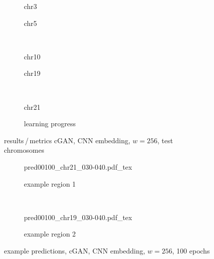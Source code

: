 \begin{figure}[p] %
    \begin{subfigure}{0.45\textwidth}
        \scriptsize
        \caption{chr3}
    \end{subfigure} \hfill
    \begin{subfigure}{0.45\textwidth}
        \scriptsize
        \caption{chr5}
    \end{subfigure}\\[5mm]
    \begin{subfigure}{0.45\textwidth}
        \scriptsize
        \caption{chr10}
    \end{subfigure}\hfill
    \begin{subfigure}{0.45\textwidth}
        \scriptsize
        \caption{chr19}
    \end{subfigure}\\[3mm]
    \centering
    \begin{subfigure}{0.45\textwidth}
        \scriptsize
        \caption{chr21}
    \end{subfigure} \hfill
    \begin{subfigure}{0.45\textwidth}
        \scriptsize
        \caption{learning progress} \label{fig:results:GAN256_lossEpochs}
    \end{subfigure}
    \caption{results\,/\,metrics cGAN, CNN embedding, $w=256$, test chromosomes}   \label{fig:results:GAN256_pearson}
\end{figure}
\begin{figure}[p] %
    \begin{subfigure}{\textwidth}
        \centering
        \scriptsize
        {pred00100_chr21_030-040.pdf_tex}
        \caption{example  region 1} \label{fig:results:cGAN256_r1}
    \end{subfigure}\\[6mm]
    \begin{subfigure}{\textwidth}
        \centering
        \scriptsize
        {pred00100_chr19_030-040.pdf_tex}
        \caption{example region 2} \label{fig:results:cGAN256_r2}
    \end{subfigure}
    \caption{example predictions, cGAN, CNN embedding, $w=256$, 100 epochs}
\end{figure}
